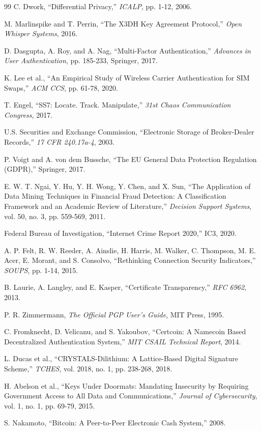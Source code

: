 \documentclass[11pt,twocolumn]{article}
\begin{document}
\begin{thebibliography}{99}
C. Dwork, ``Differential Privacy,'' \textit{ICALP}, pp. 1-12, 2006.

M. Marlinspike and T. Perrin, ``The X3DH Key Agreement Protocol,'' \textit{Open Whisper Systems}, 2016.

D. Dasgupta, A. Roy, and A. Nag, ``Multi-Factor Authentication,'' \textit{Advances in User Authentication}, pp. 185-233, Springer, 2017.

K. Lee et al., ``An Empirical Study of Wireless Carrier Authentication for SIM Swaps,'' \textit{ACM CCS}, pp. 61-78, 2020.

T. Engel, ``SS7: Locate. Track. Manipulate,'' \textit{31st Chaos Communication Congress}, 2017.

U.S. Securities and Exchange Commission, ``Electronic Storage of Broker-Dealer Records,'' \textit{17 CFR 240.17a-4}, 2003.

P. Voigt and A. von dem Bussche, ``The EU General Data Protection Regulation (GDPR),'' Springer, 2017.

E. W. T. Ngai, Y. Hu, Y. H. Wong, Y. Chen, and X. Sun, ``The Application of Data Mining Techniques in Financial Fraud Detection: A Classification Framework and an Academic Review of Literature,'' \textit{Decision Support Systems}, vol. 50, no. 3, pp. 559-569, 2011.

Federal Bureau of Investigation, ``Internet Crime Report 2020,'' IC3, 2020.

A. P. Felt, R. W. Reeder, A. Ainslie, H. Harris, M. Walker, C. Thompson, M. E. Acer, E. Morant, and S. Consolvo, ``Rethinking Connection Security Indicators,'' \textit{SOUPS}, pp. 1-14, 2015.

B. Laurie, A. Langley, and E. Kasper, ``Certificate Transparency,'' \textit{RFC 6962}, 2013.

P. R. Zimmermann, \textit{The Official PGP User's Guide}, MIT Press, 1995.

C. Fromknecht, D. Velicanu, and S. Yakoubov, ``Certcoin: A Namecoin Based Decentralized Authentication System,'' \textit{MIT CSAIL Technical Report}, 2014.

L. Ducas et al., ``CRYSTALS-Dilithium: A Lattice-Based Digital Signature Scheme,'' \textit{TCHES}, vol. 2018, no. 1, pp. 238-268, 2018.

H. Abelson et al., ``Keys Under Doormats: Mandating Insecurity by Requiring Government Access to All Data and Communications,'' \textit{Journal of Cybersecurity}, vol. 1, no. 1, pp. 69-79, 2015.

S. Nakamoto, ``Bitcoin: A Peer-to-Peer Electronic Cash System,'' 2008.

\end{thebibliography}
\end{document}
